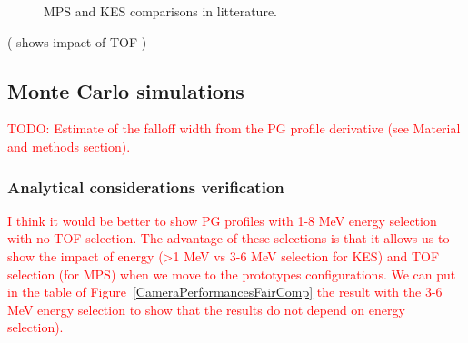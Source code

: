 \documentclass[a4paper,english]{article}
\begin{document}
\begin{figure}[htp]
  \centering
  \quad
  \caption{\label{LitteratureComp} MPS and KES comparisons in litterature.}
\end{figure}   

( \cite{Roellinghoff2014a} shows impact of TOF )

\subsection{Monte Carlo simulations}

\textcolor{red}{TODO: Estimate of the falloff width from the PG profile derivative (see Material and methods section).}

\subsubsection{Analytical considerations verification}

\textcolor{red}{I think it would be better to show PG profiles with 1-8 MeV energy selection with no TOF selection. The advantage of these selections is that it allows us to show the impact of energy (>1 MeV vs 3-6 MeV selection for KES) and TOF selection (for MPS) when we move to the prototypes configurations. We can put in the table of Figure~\ref{CameraPerformancesFairComp} the result with the 3-6 MeV energy selection to show that the results do not depend on energy selection).}
\end{document}
